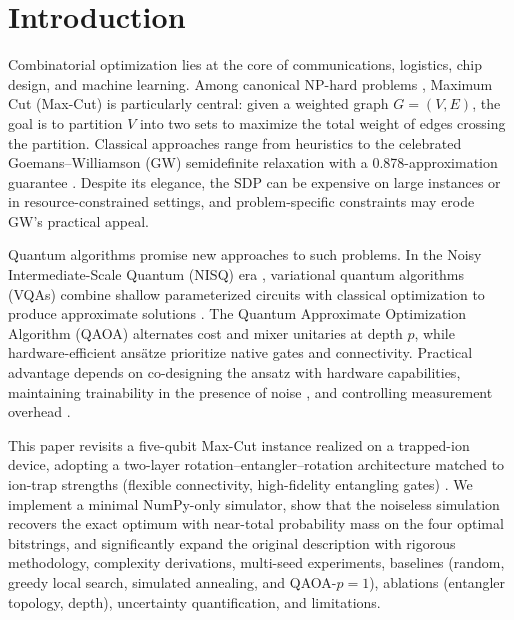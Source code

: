 \section{Introduction}
Combinatorial optimization lies at the core of communications, logistics, chip design, and machine learning. Among canonical NP-hard problems \cite{garey1979}, Maximum Cut (Max-Cut) is particularly central: given a weighted graph $G=(V,E)$, the goal is to partition $V$ into two sets to maximize the total weight of edges crossing the partition. Classical approaches range from heuristics to the celebrated Goemans--Williamson (GW) semidefinite relaxation with a 0.878-approximation guarantee \cite{goemans1995maxcut}. Despite its elegance, the SDP can be expensive on large instances or in resource-constrained settings, and problem-specific constraints may erode GW's practical appeal. 

Quantum algorithms promise new approaches to such problems. In the Noisy Intermediate-Scale Quantum (NISQ) era \cite{preskill2018nisq}, variational quantum algorithms (VQAs) combine shallow parameterized circuits with classical optimization to produce approximate solutions \cite{peruzzo2014vqe,cerezo2021variational,tilly2022vqe}. The Quantum Approximate Optimization Algorithm (QAOA) \cite{farhi2014qaoa} alternates cost and mixer unitaries at depth $p$, while hardware-efficient ans\"atze \cite{kandala2017hardware} prioritize native gates and connectivity. Practical advantage depends on co-designing the ansatz with hardware capabilities, maintaining trainability in the presence of noise \cite{mcclean2018barren,arrasmith2021trainability,wang2021noiseplateaus}, and controlling measurement overhead \cite{huggins2021efficient,verteletskyi2020measurement}.

This paper revisits a five-qubit Max-Cut instance realized on a trapped-ion device, adopting a two-layer rotation--entangler--rotation architecture matched to ion-trap strengths (flexible connectivity, high-fidelity entangling gates) \cite{bruzewicz2019trappedion,pino2021qccd,wright2019benchmarking}. We implement a minimal NumPy-only simulator, show that the noiseless simulation recovers the exact optimum with near-total probability mass on the four optimal bitstrings, and significantly expand the original description with rigorous methodology, complexity derivations, multi-seed experiments, baselines (random, greedy local search, simulated annealing, and QAOA-$p=1$), ablations (entangler topology, depth), uncertainty quantification, and limitations.

